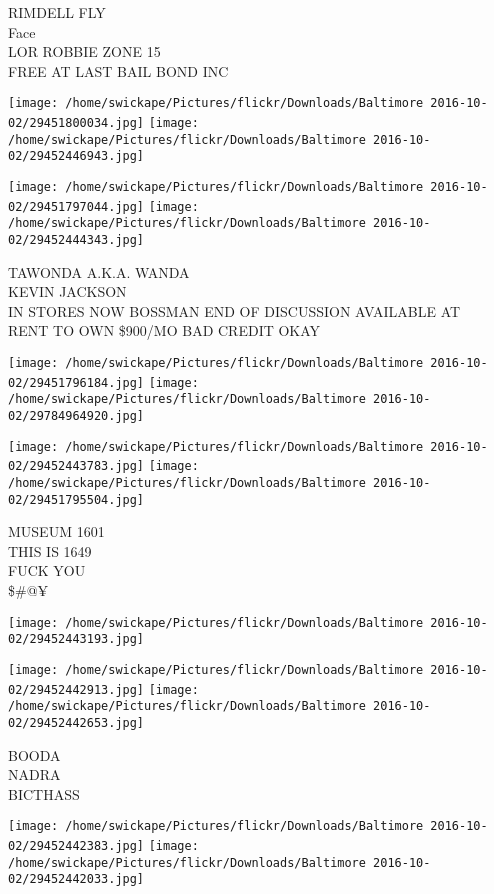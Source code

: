 \documentclass[10pt,letterpaper]{article}
\begin{document}
RIMDELL FLY\\
Face\\
LOR ROBBIE ZONE 15\\
FREE AT LAST BAIL BOND INC
\pagebreak

\texttt{[image: /home/swickape/Pictures/flickr/Downloads/Baltimore 2016-10-02/29451800034.jpg]}
\texttt{[image: /home/swickape/Pictures/flickr/Downloads/Baltimore 2016-10-02/29452446943.jpg]}

\texttt{[image: /home/swickape/Pictures/flickr/Downloads/Baltimore 2016-10-02/29451797044.jpg]}
\texttt{[image: /home/swickape/Pictures/flickr/Downloads/Baltimore 2016-10-02/29452444343.jpg]}

TAWONDA A.K.A. WANDA\\
KEVIN JACKSON\\
IN STORES NOW BOSSMAN END OF DISCUSSION AVAILABLE AT\\
RENT TO OWN \$900/MO BAD CREDIT OKAY
\pagebreak

\texttt{[image: /home/swickape/Pictures/flickr/Downloads/Baltimore 2016-10-02/29451796184.jpg]}
\texttt{[image: /home/swickape/Pictures/flickr/Downloads/Baltimore 2016-10-02/29784964920.jpg]}

\texttt{[image: /home/swickape/Pictures/flickr/Downloads/Baltimore 2016-10-02/29452443783.jpg]}
\texttt{[image: /home/swickape/Pictures/flickr/Downloads/Baltimore 2016-10-02/29451795504.jpg]}

MUSEUM 1601\\
THIS IS 1649\\
FUCK YOU\\
\$\#@¥
\pagebreak

\texttt{[image: /home/swickape/Pictures/flickr/Downloads/Baltimore 2016-10-02/29452443193.jpg]}

\vspace{0.25in}
\texttt{[image: /home/swickape/Pictures/flickr/Downloads/Baltimore 2016-10-02/29452442913.jpg]}
\texttt{[image: /home/swickape/Pictures/flickr/Downloads/Baltimore 2016-10-02/29452442653.jpg]}

BOODA\\
NADRA\\
BICTHASS
\pagebreak

\texttt{[image: /home/swickape/Pictures/flickr/Downloads/Baltimore 2016-10-02/29452442383.jpg]}
\texttt{[image: /home/swickape/Pictures/flickr/Downloads/Baltimore 2016-10-02/29452442033.jpg]}
\end{document}
